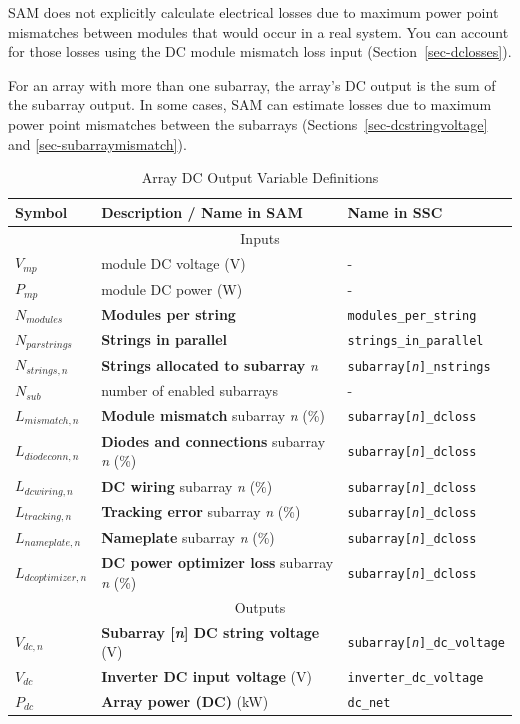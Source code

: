 \documentclass[12pt,letterpaper]{article}
\begin{document}
SAM does not explicitly calculate electrical losses due to maximum power point mismatches between modules that would occur in a real system. You can account for those losses using the DC module mismatch loss input  (Section~\ref{sec-dclosses}).

For an array with more than one subarray, the array's DC output is the sum of the subarray output. In some cases, SAM can estimate losses due to maximum power point mismatches between the subarrays (Sections~\ref{sec-dcstringvoltage} and \ref{sec-subarraymismatch}).

\begin{table}
\begin{center}
\caption{Array DC Output Variable Definitions}
\begin{tabular}{lll}
\midrule
Symbol & Description / \textbf{Name in SAM} & Name in SSC \\
\midrule
\multicolumn{3}{c}{Inputs}\\
$V_{mp}$ & module DC voltage (V)& - \\
$P_{mp}$ & module DC power (W) & - \\
$N_{modules}$ & \textbf{Modules per string} & \texttt{modules\_per\_string} \\
$N_{parstrings}$ & \textbf{Strings in parallel} & \texttt{strings\_in\_parallel} \\
$N_{strings,n}$ & \textbf{Strings allocated to subarray} \textit{n} & \texttt{subarray[\textit{n}]\_nstrings} \\
$N_{sub}$ & number of enabled subarrays & - \\
$L_{mismatch,n}$ & \textbf{Module mismatch} subarray \textit{n} (\%)&  \texttt{subarray[\textit{n}]\_dcloss} \\
$L_{diodeconn,n}$ & \textbf{Diodes and connections} subarray \textit{n} (\%)&  \texttt{subarray[\textit{n}]\_dcloss} \\
$L_{dcwiring,n}$ & \textbf{DC wiring} subarray \textit{n} (\%)&  \texttt{subarray[\textit{n}]\_dcloss} \\
$L_{tracking,n}$ & \textbf{Tracking error} subarray \textit{n} (\%)&  \texttt{subarray[\textit{n}]\_dcloss} \\
$L_{nameplate,n}$ & \textbf{Nameplate} subarray \textit{n} (\%)&  \texttt{subarray[\textit{n}]\_dcloss} \\
$L_{dcoptimizer,n}$ & \textbf{DC power optimizer loss} subarray \textit{n} (\%)&  \texttt{subarray[\textit{n}]\_dcloss} \\
\midrule
\multicolumn{3}{c}{Outputs}\\
$V_{dc,n}$ & \textbf{Subarray [\textit{n}] DC string voltage} (V)& \texttt{subarray[\textit{n}]\_dc\_voltage} \\
$V_{dc}$ & \textbf{Inverter DC input voltage} (V)& \texttt{inverter\_dc\_voltage} \\
$P_{dc}$ & \textbf{Array power (DC)} (kW)& \texttt{dc\_net} \\
\hline
\end{tabular}
\label{tab-arraydcoutputvars}
\end{center}
\end{table}
\end{document}
